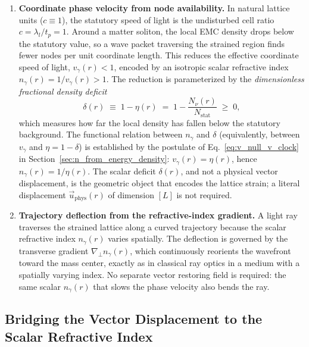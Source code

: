 \documentclass[10pt,a4paper]{article}
\begin{document}
\begin{enumerate}
	\item \textbf{Coordinate phase velocity from node availability.}
	In natural lattice units ($c \equiv 1$), the statutory speed of
	light is the undisturbed cell ratio $c = \lambda_l / t_p = 1$.
	Around a matter soliton, the local EMC density drops below the
	statutory value, so a wave packet traversing the strained region
	finds fewer nodes per unit coordinate length. This reduces the
	effective coordinate speed of light, $v_\gamma(r) < 1$, encoded
	by an isotropic scalar refractive index $n_\gamma(r) =
	1/v_\gamma(r) > 1$. The reduction is parameterized by the
	\emph{dimensionless fractional density deficit}
	\begin{equation}
		\delta(r) \;\equiv\; 1 - \eta(r)
		\;=\; 1 - \frac{N_\nu(r)}{N_{\text{stat}}}
		\;\ge\; 0,
		\label{eq:density_deficit}
	\end{equation}
	which measures how far the local density has fallen below the
	statutory background. The functional relation between
	$n_\gamma$ and $\delta$ (equivalently, between $v_\gamma$ and
	$\eta = 1 - \delta$) is established by the postulate of
	Eq.~\eqref{eq:v_null_v_clock} in
	Section~\ref{sec:n_from_energy_density}:
	$v_\gamma(r) = \eta(r)$, hence $n_\gamma(r) = 1/\eta(r)$.
	The scalar deficit $\delta(r)$, and not a physical vector
	displacement, is the geometric object that encodes the lattice
	strain; a literal displacement $\vec{u}_{\text{phys}}(r)$ of
	dimension $[L]$ is not required.
	
	\item \textbf{Trajectory deflection from the refractive-index
		gradient.} A light ray traverses the strained lattice along a
	curved trajectory because the scalar refractive index
	$n_\gamma(r)$ varies spatially. The deflection is governed by
	the transverse gradient $\nabla_\perp n_\gamma(r)$, which
	continuously reorients the wavefront toward the mass center,
	exactly as in classical ray optics in a medium with a spatially
	varying index. No separate vector restoring field is required:
	the same scalar $n_\gamma(r)$ that slows the phase velocity
	also bends the ray.
\end{enumerate}

\subsection{Bridging the Vector Displacement to the Scalar Refractive Index}
\label{sec:bridging_u_to_n}
\end{document}
